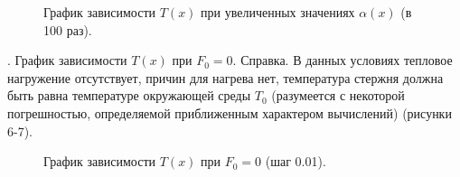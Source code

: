 \documentclass[a4paper,14pt]{article}
\begin{document}
\begin{figure}[!h]
	\caption{График зависимости $T(x)$ при увеличенных значениях $\alpha(x)$ (в 100 раз).}
	\label{fig:image}
\end{figure}

. График зависимости $T(x)$ при $F_0 = 0$.
Справка. В данных условиях тепловое нагружение отсутствует, причин для нагрева нет, температура стержня должна быть равна температуре окружающей среды
$T_0$ (разумеется с некоторой погрешностью, определяемой приближенным характером вычислений) (рисунки 6-7).

\begin{figure}[!h]
	\caption{График зависимости $T(x)$ при $F_0 = 0$ (шаг 0.01).}
	\label{fig:image}
\end{figure}
\end{document}
